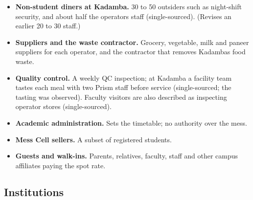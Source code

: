 \documentclass[
  10pt,
  table]{article}
\begin{document}
\begin{itemize}
\item
  \textbf{Non-student diners at Kadamba.} 30 to 50 outsiders such as night-shift security, and about half the operator\textquotesingle s staff (single-sourced). (Revises an earlier 20 to 30 staff.)
\item
  \textbf{Suppliers and the waste contractor.} Grocery, vegetable, milk and paneer suppliers for each operator, and the contractor that removes Kadamba\textquotesingle s food waste.
\item
  \textbf{Quality control.} A weekly QC inspection; at Kadamba a facility team tastes each meal with two Prism staff before service (single-sourced; the tasting was observed). Faculty visitors are also described as inspecting operator stores (single-sourced).
\item
  \textbf{Academic administration.} Sets the timetable; no authority over the mess.
\item
  \textbf{Mess Cell sellers.} A subset of registered students.
\item
  \textbf{Guests and walk-ins.} Parents, relatives, faculty, staff and other campus affiliates paying the spot rate.
\end{itemize}

\subsection{Institutions}\label{institutions}
\end{document}
